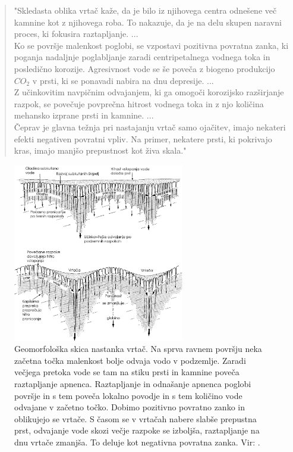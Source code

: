 \documentclass[a4paper, twoside, 12pt]{book}
\begin{document}
\begin{quotation}
"Skledasta oblika vrtač kaže, da je bilo iz njihovega centra odnešene več kamnine kot z njihovega roba. To nakazuje, da je na delu skupen naravni proces, ki fokusira raztapljanje. ... \\
Ko se površje malenkost poglobi, se vzpostavi pozitivna povratna zanka, ki poganja nadaljnje poglabljanje zaradi centripetalnega vodnega toka in posledično korozije. Agresivnost vode se še poveča z biogeno produkcijo $CO_2$ v prsti, ki se ponavadi nabira na dnu depresije. ... \\
Z učinkovitim navpičnim odvajanjem, ki ga omogoči korozijsko razširjanje razpok, se povečuje povprečna hitrost vodnega toka in z njo količina mehansko izprane prsti in kamnine. ... \\
Čeprav je glavna težnja pri nastajanju vrtač samo ojačitev, imajo nekateri efekti negativen povratni vpliv. Na primer, nekatere prsti, ki pokrivajo kras, imajo manjšo prepustnost kot živa skala."
\end{quotation}
\begin{figure}[h!]
  \begin{center}
    \includegraphics[width=7.5cm]{slike/vrtaca-ford-williams.jpg}
  \end{center}
  \caption{Geomorfološka skica nastanka vrtač. Na sprva ravnem površju neka začetna točka malenkost bolje odvaja vodo v podzemlje. Zaradi večjega pretoka vode se tam na stiku prsti in kamnine poveča raztapljanje apnenca. Raztapljanje in odnašanje apnenca poglobi površje in s tem poveča lokalno povodje in s tem količino vode odvajane v začetno točko. Dobimo pozitivno povratno zanko in oblikujejo se vrtače. S časom se v vrtačah nabere slabše prepustna prst, odvajanje vode skozi večje razpoke se izboljša, raztapljanje na dnu vrtače zmanjša. To deluje kot negativna povratna zanka. Vir: \cite{ford2007karst}.}
\label{fig:vrtaca-ford-williams}
\end{figure}
\end{document}
